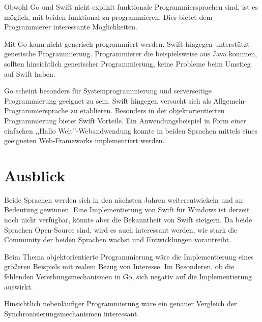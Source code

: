 Obwohl Go und Swift nicht explizit funktionale Programmiersprachen sind, ist es möglich, mit beiden funktional zu programmieren.
Dies bietet dem Programmierer interessante Möglichkeiten.

Mit Go kann nicht generisch programmiert werden.
Swift hingegen unterstützt generische Programmierung. 
Programmierer die beispielsweise aus Java kommen, sollten hinsichtlich generischer Programmierung, keine Probleme beim Umstieg auf Swift haben.

Go scheint besonders für Systemprogrammierung und serverseitige Programmierung geeignet zu sein.
Swift hingegen versucht sich als Allgemein-Programmiersprache zu etablieren.
Besonders in der objektorientierten Programmierung bietet Swift Vorteile.
Ein Anwendungsbeispiel in Form einer einfachen ,,Hallo Welt''-Webandwendung konnte in beiden Sprachen mittels eines geeigneten Web-Frameworks implementiert werden.

\chapter{Ausblick}
Beide Sprachen werden sich in den nächsten Jahren weiterentwickeln und an Bedeutung gewinnen. 
Eine Implementierung von Swift für Windows ist derzeit noch nicht verfügbar, könnte aber die Bekanntheit von Swift steigern.
Da beide Sprachen Open-Source sind, wird es auch interessant werden, wie stark die Community der beiden Sprachen wächst und Entwicklungen vorantreibt.

Beim Thema objektorientierte Programmierung wäre die Implementierung eines größeren Beispiels mit realem Bezug von Interesse.
Im Besonderen, ob die fehlenden Vererbungsmechanismen in Go, sich negativ auf die Implementierung auswirkt.

Hinsichtlich nebenläufiger Programmierung wäre ein genauer Vergleich der Synchronisierungsmechanismen interessant.
